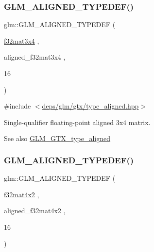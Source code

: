 \subsubsection{\texorpdfstring{G\+L\+M\+\_\+\+A\+L\+I\+G\+N\+E\+D\+\_\+\+T\+Y\+P\+E\+D\+E\+F()}{GLM\_ALIGNED\_TYPEDEF()}\hspace{0.1cm}{\footnotesize\ttfamily [189/209]}}
{\footnotesize\ttfamily glm\+::\+G\+L\+M\+\_\+\+A\+L\+I\+G\+N\+E\+D\+\_\+\+T\+Y\+P\+E\+D\+EF (\begin{DoxyParamCaption}\item[{\hyperlink{group__gtc__type__precision_ga8459d79e94eb107e31f0ee600e9bae3f}{f32mat3x4}}]{,  }\item[{aligned\+\_\+f32mat3x4}]{,  }\item[{16}]{ }\end{DoxyParamCaption})}



{\ttfamily \#include $<$\hyperlink{gtx_2type__aligned_8hpp}{deps/glm/gtx/type\+\_\+aligned.\+hpp}$>$}

Single-\/qualifier floating-\/point aligned 3x4 matrix. \begin{DoxySeeAlso}{See also}
\hyperlink{group__gtx__type__aligned}{G\+L\+M\+\_\+\+G\+T\+X\+\_\+type\+\_\+aligned} 
\end{DoxySeeAlso}
\mbox{\label{group__gtx__type__aligned_ga99ce8274c750fbfdf0e70c95946a2875}} 
\subsubsection{\texorpdfstring{G\+L\+M\+\_\+\+A\+L\+I\+G\+N\+E\+D\+\_\+\+T\+Y\+P\+E\+D\+E\+F()}{GLM\_ALIGNED\_TYPEDEF()}\hspace{0.1cm}{\footnotesize\ttfamily [190/209]}}
{\footnotesize\ttfamily glm\+::\+G\+L\+M\+\_\+\+A\+L\+I\+G\+N\+E\+D\+\_\+\+T\+Y\+P\+E\+D\+EF (\begin{DoxyParamCaption}\item[{\hyperlink{group__gtc__type__precision_gab0498cc84bb77002f41630e3cd0be87b}{f32mat4x2}}]{,  }\item[{aligned\+\_\+f32mat4x2}]{,  }\item[{16}]{ }\end{DoxyParamCaption})}



